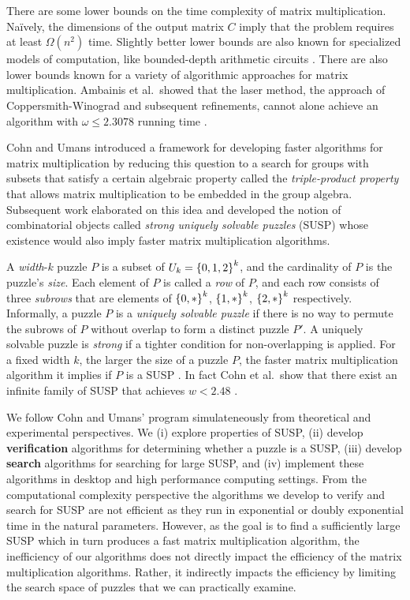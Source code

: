 \documentclass[11pt]{article}
\begin{document}
There are some lower bounds on the time complexity of matrix
multiplication.  Na\"{i}vely, the dimensions of the output matrix $C$
imply that the problem requires at least $\Omega(n^2)$ time.  Slightly
better lower bounds are also known for specialized models of
computation, like bounded-depth arithmetic circuits \cite{XXX}.  There
are also lower bounds known for a variety of algorithmic approaches
for matrix multiplication.  Ambainis et al.~showed that the laser
method, the approach of Coppersmith-Winograd and subsequent
refinements, cannot alone achieve an algorithm with $\omega \le
2.3078$ running time \cite{afl14}.



Cohn and Umans \cite{cu03} introduced a framework for developing
faster algorithms for matrix multiplication by reducing this question
to a search for groups with subsets that satisfy a certain algebraic
property called the \emph{triple-product property} that allows matrix
multiplication to be embedded in the group algebra.  Subsequent work
\cite{cksu05} elaborated on this idea and developed the notion of
combinatorial objects called \emph{strong uniquely solvable puzzles}
(SUSP) whose existence would also imply faster matrix multiplication
algorithms.

A \emph{width}-$k$ puzzle $P$ is a subset of $U_k = \left\{ 0,1,2 \right\}^k$,
and the cardinality of $P$ is the puzzle's \emph{size}.  Each element
of $P$ is called a \emph{row} of $P$, and each row consists of three
\emph{subrows} that are elements of $\left\{ 0,* \right\}^k$, $\left\{ 1,* \right\}^k$,
$\left\{ 2,* \right\}^k$ respectively.  Informally, a puzzle $P$ is a
\emph{uniquely solvable puzzle} if there is no way to permute the
subrows of $P$ without overlap to form a distinct puzzle $P'$.  A
uniquely solvable puzzle is \emph{strong} if a tighter condition for
non-overlapping is applied. For a fixed width $k$, the larger the size
of a puzzle $P$, the faster matrix multiplication algorithm it implies
if $P$ is a SUSP \cite[Corollary 3.6]{cksu05}.  In fact Cohn et
al.~show that there exist an infinite family of SUSP that achieves $w <
2.48$ \cite[Proposition 3.8]{cksu05}.


We follow Cohn and Umans' program simulateneously from theoretical and
experimental perspectives.  We (i) explore properties of SUSP, (ii)
develop \textbf{verification} algorithms for determining whether a
puzzle is a SUSP, (iii) develop \textbf{search} algorithms for searching
for large SUSP, and (iv) implement these algorithms in desktop and
high performance computing settings.  From the computational
complexity perspective the algorithms we develop to verify and search
for SUSP are not efficient as they run in exponential or doubly
exponential time in the natural parameters.  However, as the goal is
to find a sufficiently large SUSP which in turn produces a fast matrix
multiplication algorithm, the inefficiency of our algorithms does not
directly impact the efficiency of the matrix multiplication
algorithms.  Rather, it indirectly impacts the efficiency by limiting
the search space of puzzles that we can practically examine.
\end{document}

